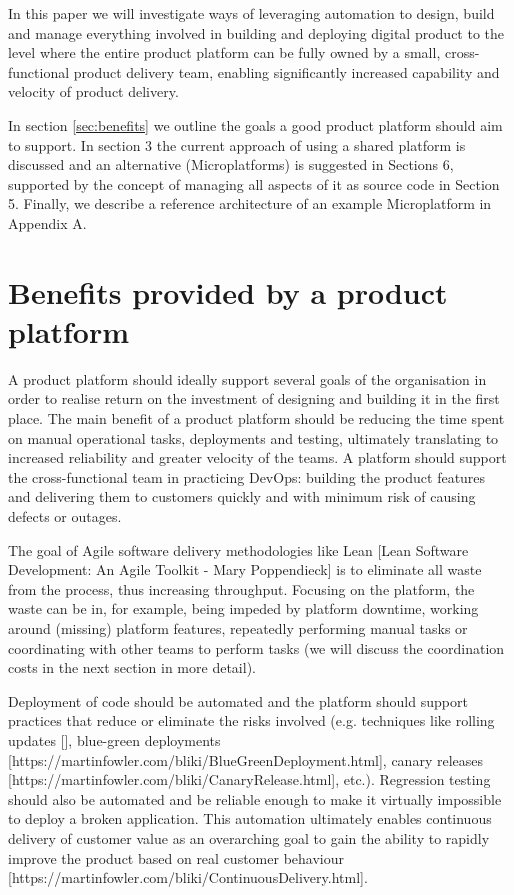 \documentclass[reprint,amsmath,amssymb,aps]{revtex4-1}
\begin{document}
In this paper we will investigate ways of leveraging automation to design, build and manage everything involved in building and deploying digital product to the level where the entire product platform can be fully owned by a small, cross-functional product delivery team, enabling significantly increased capability and velocity of product delivery. 

In section \ref{sec:benefits} we outline the goals a good product platform should aim to support. In section 3 the current approach of using a shared platform is discussed and an alternative (Microplatforms) is suggested in Sections 6, supported by the concept of managing all aspects of it as source code in Section 5. Finally, we describe a reference architecture of an example Microplatform in Appendix A.


\section{\label{sec:benefits}Benefits provided by a product platform}

A product platform should ideally support several goals of the organisation in order to realise return on the investment of designing and building it in the first place. The main benefit of a product platform should be reducing the time spent on manual operational tasks, deployments and testing, ultimately translating to increased reliability and greater velocity of the teams. A platform should support the cross-functional team in practicing DevOps: building the product features and delivering them to customers quickly and with minimum risk of causing defects or outages.

The goal of Agile software delivery methodologies like Lean [Lean Software Development: An Agile Toolkit - Mary Poppendieck] is to eliminate all waste from the process, thus increasing throughput. Focusing on the platform, the waste can be in, for example, being impeded by platform downtime, working around (missing) platform features, repeatedly performing manual tasks or coordinating with other teams to perform tasks (we will discuss the coordination costs in the next section in more detail).

Deployment of code should be automated and the platform should support practices that reduce or eliminate the risks involved (e.g. techniques like rolling updates [], blue-green deployments [https://martinfowler.com/bliki/BlueGreenDeployment.html], canary releases [https://martinfowler.com/bliki/CanaryRelease.html], etc.). Regression testing should also be automated and be reliable enough to make it virtually impossible to deploy a broken application. This automation ultimately enables continuous delivery of customer value as an overarching goal to gain the ability to rapidly improve the product based on real customer behaviour [https://martinfowler.com/bliki/ContinuousDelivery.html].
\end{document}
